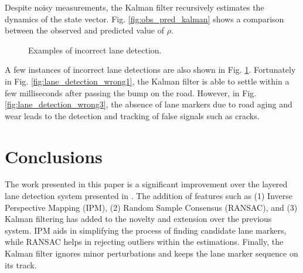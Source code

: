 \documentclass{article}
\begin{document}
Despite noisy measurements, the Kalman filter recursively estimates the dynamics of the state vector. Fig. \ref{fig:obs_pred_kalman} shows a comparison between the observed and predicted value of $\rho$.
\begin{figure}[htb!]
  \centering
  \hspace{0.00001in}
  \caption{Examples of incorrect lane detection.}
  \label{fig:lane_detection_wrong}
\end{figure}

A few instances of incorrect lane detections are also shown in Fig. \ref{fig:lane_detection_wrong}. Fortunately in Fig. \ref{fig:lane_detection_wrong1}, the Kalman filter is able to settle within a few milliseconds after passing the bump on the road. However, in Fig. \ref{fig:lane_detection_wrong3}, the absence of lane markers due to road aging and wear leads to the detection and tracking of false signals such as cracks.
\section{Conclusions}
\label{sec:concl}
The work presented in this paper is a significant improvement over the layered lane detection system presented in \cite{borkar_layered_2009}. The addition of features such as (1) Inverse Perspective Mapping (IPM), (2) Random Sample Consensus (RANSAC), and (3) Kalman filtering has added to the novelty and extension over the previous system. IPM aids in simplifying the process of finding candidate lane markers, while RANSAC helps in rejecting outliers within the estimations. Finally, the Kalman filter ignores minor perturbations and keeps the lane marker sequence on its track.
\end{document}
